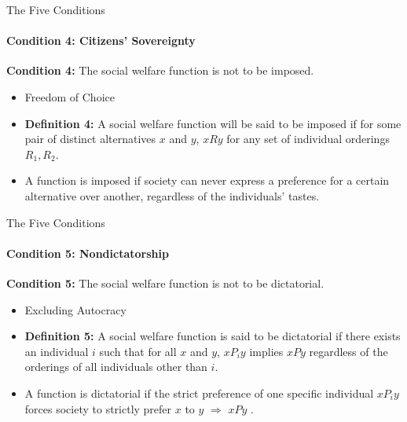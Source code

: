 \documentclass{beamer}
\begin{document}
\begin{frame}{The Five Conditions}
    \framesubtitle{Condition 4: Citizens' Sovereignty}
    \textbf{Condition 4:} The social welfare function is not to be imposed.
    \begin{itemize}
        \item[$\Rightarrow$] Freedom of Choice
    \end{itemize}
    \vspace{0.5 cm}
    \begin{itemize}
        \item \textbf{Definition 4:} A social welfare function will be said to be imposed if for some pair of distinct alternatives $x$ and $y$, $xRy$ for any set of individual orderings $R_1, R_2$.
        \item A function is imposed if society can never express a preference for a certain alternative over another, regardless of the individuals' tastes. 
    \end{itemize}
\end{frame}

\begin{frame}{The Five Conditions}
    \framesubtitle{Condition 5: Nondictatorship}
    \textbf{Condition 5:} The social welfare function is not to be dictatorial.
    \begin{itemize}
        \item[$\Rightarrow$] Excluding Autocracy
    \end{itemize}
    \vspace{0.5 cm}
    \begin{itemize}
        \item \textbf{Definition 5:} A social welfare function is said to be dictatorial if there exists an individual $i$ such that for all $x$ and $y$, $xP_iy$ implies $xPy$ regardless of the orderings of all individuals other than $i$.
   
        \item A function is dictatorial if the strict preference of one specific individual $x P_i y$ forces society to strictly prefer $x$ to $y$ $\Rightarrow$ $xPy$ .
    \end{itemize}
\end{frame}

\end{document}
